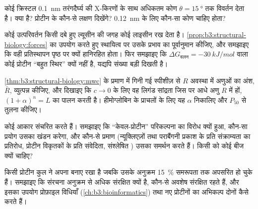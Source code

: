 \begin{exercise}[$\star\star$]\label{exo:b3:structural-biology:8}
कोई क्रिस्टल \qty{0.1}{nm} तरंगदैर्घ्य की X-किरणों के साथ अधिकतम कोण
$\theta = \qty{15}{\degree}$ तक विवर्तन देता है।  क्या है?
प्रोटीन के कौन-से लक्षण दिखेंगे? \qty{0.12}{nm} के लिए कौन-सा कोण
चाहिए होता?
\end{exercise}

\begin{exercise}[$\star\star$]\label{exo:b3:structural-biology:9}
कोई उत्परिवर्तन किसी दबे हुए ल्यूसीन की जगह कोई लाइसीन रख देता है।
\cref{prop:b3:structural-biology:forces} का उपयोग करते हुए स्थायित्व पर
उसके प्रभाव का पूर्वानुमान कीजिए, और समझाइए कि वही प्रतिस्थापन पृष्ठ पर
क्यों हानिरहित होता। फिर समझाइए कि $\Delta G_{\text{वलन}} =
\qty{-30}{kJ/mol}$ वाला कोई प्रोटीन ``बहुत स्थिर'' क्यों नहीं है,
यद्यपि संख्या बड़ी दिखती है।
\end{exercise}

\begin{exercise}[$\star\star\star$]\label{exo:b3:structural-biology:10}
\cref{thm:b3:structural-biology:mwc} के प्रमाण में गिनी गई स्पीशीज़ से
$R$ अवस्था में अणुओं का अंश, $\bar R$, व्युत्पन्न कीजिए,
और दिखाइए कि $c \to 0$ के लिए वह लिगंड सांद्रता जिस पर आधे अणु
$R$ में हों, $(1+\alpha)^{n} = L$ का पालन करती है। हीमोग्लोबिन के
प्राचलों के लिए यह $\alpha$ निकालिए और $P_{50}$ से तुलना कीजिए।
\end{exercise}

\begin{exercise}[$\star\star\star$]\label{exo:b3:structural-biology:11}
 कोई आकार संचरित करते हैं। समझाइए कि ``केवल-प्रोटीन'' परिकल्पना
का विरोध क्यों हुआ, कौन-सा प्रयोग उसका खंडन करेगा, और कौन-से प्रमाण
(न्यूक्लिएज़ों तथा पराबैंगनी प्रकाश के प्रति संक्राम्यता का प्रतिरोध,
प्रोटीन विकृतकों के प्रति संवेदिता, संश्लेषित ) उसका समर्थन करते
हैं। किसी  को कोई बीज क्यों चाहिए?
\end{exercise}

\begin{exercise}[$\star\star\star$]\label{exo:b3:structural-biology:12}
किसी प्रोटीन कुल ने अपना  बनाए रखा है जबकि उसके अनुक्रम \qty{15}{\%}
समरूपता तक अपसरित हो चुके हैं। समझाइए कि संरचना अनुक्रम से अधिक
संरक्षित क्यों है, कौन-से अवशेष संरक्षित रहते हैं, और इसका उपयोग
प्रोफ़ाइल विधियाँ (\cref{ch:b3:bioinformatics}) तथा नए प्रोटीनों का
अभिकल्प दोनों कैसे करते हैं।
\end{exercise}

